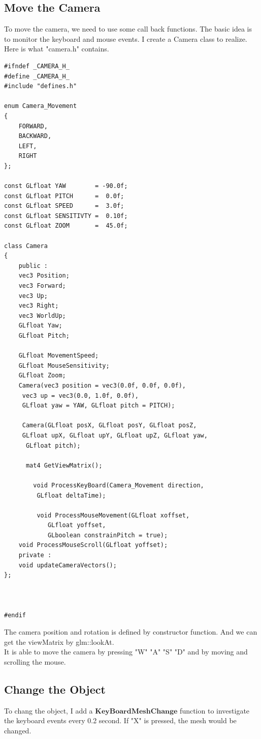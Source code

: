 \documentclass[acmtog]{acmart}
\begin{document}
	\subsection{Move the Camera}
	\quad To move the camera, we need to use some call back functions.
	The basic idea is to monitor the keyboard and mouse events. I create a Camera class to 
	realize. Here is what "camera.h" contains.\\
	\begin{lstlisting}
#ifndef _CAMERA_H_
#define _CAMERA_H_
#include "defines.h"

enum Camera_Movement
{
    FORWARD,
    BACKWARD,
    LEFT,
    RIGHT
};

const GLfloat YAW        = -90.0f;
const GLfloat PITCH      =  0.0f;
const GLfloat SPEED      =  3.0f;
const GLfloat SENSITIVTY =  0.10f;
const GLfloat ZOOM       =  45.0f;

class Camera
{
    public :
    vec3 Position;
    vec3 Forward;
    vec3 Up;
    vec3 Right;
    vec3 WorldUp;
    GLfloat Yaw;
    GLfloat Pitch;

    GLfloat MovementSpeed;
    GLfloat MouseSensitivity;
    GLfloat Zoom;
    Camera(vec3 position = vec3(0.0f, 0.0f, 0.0f),
	 vec3 up = vec3(0.0, 1.0f, 0.0f), 
	 GLfloat yaw = YAW, GLfloat pitch = PITCH);
    
	 Camera(GLfloat posX, GLfloat posY, GLfloat posZ,
	 GLfloat upX, GLfloat upY, GLfloat upZ, GLfloat yaw,
	  GLfloat pitch);
	
	  mat4 GetViewMatrix();
    
		void ProcessKeyBoard(Camera_Movement direction,
		 GLfloat deltaTime);
    
		 void ProcessMouseMovement(GLfloat xoffset, 
			GLfloat yoffset, 
			GLboolean constrainPitch = true);
    void ProcessMouseScroll(GLfloat yoffset);
    private :
    void updateCameraVectors();
};



#endif
	\end{lstlisting}
	\quad The camera position and rotation is defined by constructor function. And we can get the viewMatrix by glm::lookAt.
	\\ It is able to move the camera by pressing "W" "A"
	"S" "D" and by moving and scrolling the mouse.
	\subsection {Change the Object}
	To chang the object, I add a $\textbf{KeyBoardMeshChange}$ function to investigate
	the keyboard events every 0.2 second. If "X" is pressed, the mesh would be changed.
\end{document}
